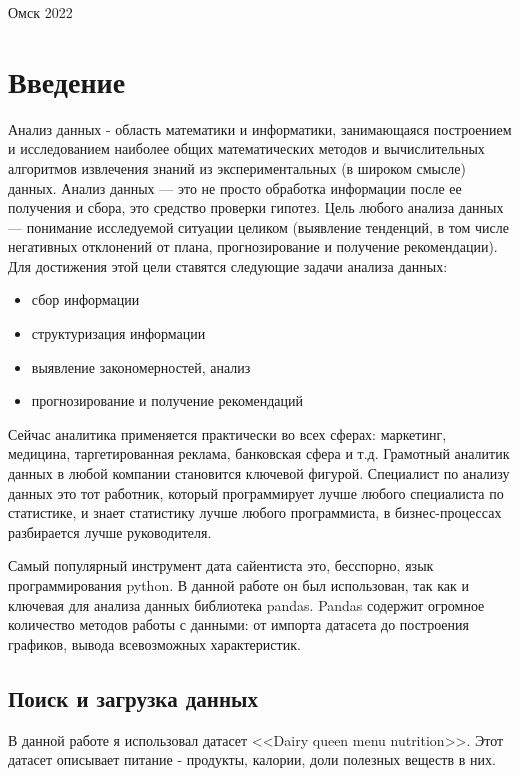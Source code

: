 \documentclass[14pt, a4paper]{article}
\begin{document}
    \vspace*{\fill}
    \begin{center}
        Омск 2022
    \end{center}

    \newpage

    \tableofcontents

    \newpage

    \section{Введение}

    Анализ данных - область математики и информатики, занимающаяся построением и исследованием наиболее общих математических методов и вычислительных алгоритмов извлечения знаний из экспериментальных (в широком смысле) данных. Анализ данных — это не просто обработка информации после ее получения и сбора, это средство проверки гипотез. Цель любого анализа данных — понимание исследуемой ситуации целиком (выявление тенденций, в том числе негативных отклонений от плана, прогнозирование и получение рекомендации). Для достижения этой цели ставятся следующие задачи анализа данных:

    \begin{itemize}
        \item сбор информации
        \item структуризация информации
        \item выявление закономерностей, анализ
        \item прогнозирование и получение рекомендаций
    \end{itemize}

    Сейчас аналитика применяется практически во всех сферах: маркетинг, медицина, таргетированная реклама, банковская сфера и т.д. Грамотный аналитик данных в любой компании становится ключевой фигурой. Специалист по анализу данных это тот работник, который программирует лучше любого специалиста по статистике, и знает статистику лучше любого программиста, в бизнес-процессах разбирается лучше руководителя.

    Самый популярный инструмент дата сайентиста это, бесспорно, язык программирования python. В данной работе он был использован, так как и  ключевая для анализа данных библиотека pandas. Pandas содержит огромное количество методов работы с данными: от импорта датасета до построения графиков, вывода всевозможных характеристик.

    \subsection{Поиск и загрузка данных}
    В данной работе я использовал датасет <<Dairy queen menu nutrition>>. Этот датасет описывает питание - продукты, калории, доли полезных веществ в них.
\end{document}
